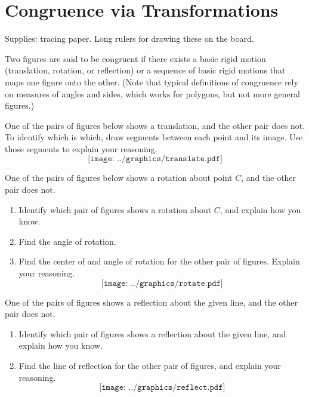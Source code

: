 \newpage

\section{Congruence via Transformations}
\begin{teachingnote}
Supplies:  tracing paper.  Long rulers for drawing these on the board.
\end{teachingnote}
Two figures are said to be congruent if there exists a basic rigid motion (translation, 
rotation, or reflection) or a sequence of basic rigid motions that maps one figure onto 
the other.  (Note that typical definitions of congruence rely on measures of 
angles and sides, which works for polygons, but not more general figures.)  

\begin{prob}
One of the pairs of figures below shows a translation, and the other pair does not.  To identify which is which, draw segments between each point and its image.  Use those segments to explain your reasoning.
$$\texttt{[image: ../graphics/translate.pdf]}$$
\end{prob}

\newpage

\begin{prob}
One of the pairs of figures below shows a rotation about point $C$, and the other pair does not. 
\begin{enumerate}
\item Identify which pair of figures shows a rotation about $C$, and explain how you know.  
\item Find the angle of rotation.  
\item Find the center of and angle of rotation for the other pair of figures.  Explain your reasoning.  
$$\texttt{[image: ../graphics/rotate.pdf]}$$
\end{enumerate}
\end{prob}

\newpage
\begin{prob}
One of the pairs of figures shows a reflection about the given line, and the other pair does not.  
\begin{enumerate}
\item Identify which pair of figures shows a reflection about the given line, and explain how you know. 
\item Find the line of reflection for the other pair of figures, and explain your reasoning.  
$$\texttt{[image: ../graphics/reflect.pdf]}$$
\end{enumerate}
\end{prob}

